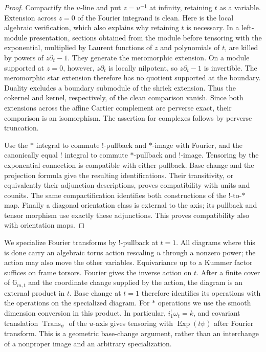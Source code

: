 \begin{proof}
Compactify the $u$-line and put $z=u^{-1}$ at infinity, retaining $t$
as a variable.  Extension across $z=0$ of the Fourier integrand is
clean.  Here is the local algebraic verification, which also explains
why retaining $t$ is necessary.  In a left-module presentation,
sections obtained from the module before tensoring with the
exponential, multiplied by Laurent functions of $z$ and polynomials
of $t$, are killed by powers of $z\partial_t-1$.  They generate the
meromorphic extension.  On a module supported at $z=0$, however,
$z\partial_t$ is locally nilpotent, so $z\partial_t-1$ is invertible.
The meromorphic star extension therefore has no quotient supported at
the boundary.  Duality excludes a boundary submodule of the
shriek extension.  Thus the cokernel and kernel, respectively,
of the clean comparison vanish.  Since both
extensions across the affine Cartier complement are perverse exact,
their comparison is an isomorphism.  The assertion for complexes
follows by perverse truncation.

Use the $*$ integral to commute $!$-pullback and $*$-image with
Fourier, and the canonically equal $!$ integral to commute $*$-pullback
and $!$-image.  Tensoring by the exponential connection is compatible
with either pullback.  Base change and the projection formula give
the resulting identifications.  Their transitivity, or equivalently
their adjunction descriptions, proves compatibility with units and
counits.  The same compactification identifies both constructions of
the $!$-to-$*$ map.  Finally a diagonal orientation class is external
to the axis; its pullback and tensor morphism use exactly these
adjunctions.  This proves compatibility also with orientation maps.
\end{proof}

We specialize Fourier transforms by $!$-pullback at $t=1$.  All
diagrams where this is done carry an algebraic torus action rescaling
$u$ through a nonzero power; the action may also move the other
variables.  Equivariance up to a Kummer factor suffices on frame
torsors.  Fourier gives the inverse action on $t$.  After a finite
cover of $\mathbb G_{m,t}$ and the coordinate change supplied by the
action, the diagram is an external product in $t$.  Base change at
$t=1$ therefore identifies its operations with the operations on the
specialized diagram.  For $*$ operations we use the smooth dimension
conversion in this product.  In particular,
$i_1^!\omega_t=k$, and covariant translation
$\operatorname{Trans}_{\psi}$ of the $u$-axis gives tensoring with
$\operatorname{Exp}(t\psi)$ after Fourier transform.  This is a
geometric base-change argument, rather than an interchange of a
nonproper image and an arbitrary specialization.

